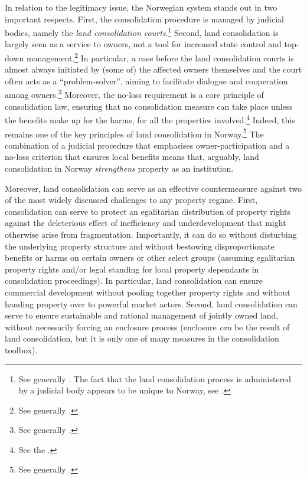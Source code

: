 In relation to the legitimacy issue, the Norwegian system stands out in two important respects. First, the consolidation procedure is managed by judicial bodies, namely the {\it land consolidation courts}.\footnote{See generally \cite{langbach09}. The fact that the land consolidation process is administered by a judicial body appears to be unique to Norway, see \cite[45]{sky01}.} Second, land consolidation is largely seen as a service to owners, not a tool for increased state control and top-down management.\footnote{See generally \cite{sky09}.} In particular, a case before the land consolidation courts is almost always initiated by (some of) the affected owners themselves and the court often acts as a ``problem-solver'', aiming to facilitate dialogue and cooperation among owners.\footnote{See generally \cite{rognes98,rognes03,rognes07}.} Moreover, the no-loss requirement is a core principle of consolidation law, ensuring that no consolidation measure can take place unless the benefits make up for the harms, for all the properties involved.\footnote{See the \cite[3 a)]{lca79}.} Indeed, this remains one of the key principles of land consolidation in Norway.\footnote{See generally \cite{rygg98}.} The combination of a judicial procedure that emphasises owner-participation and a no-loss criterion that ensures local benefits means that, arguably, land consolidation in Norway {\it strengthens} property as an institution.

Moreover, land consolidation can serve as an effective countermeasure against two of the most widely discussed challenges to any property regime. First, consolidation can serve to protect an egalitarian distribution of property rights against the deleterious effect of inefficiency and underdevelopment that might otherwise arise from fragmentation. Importantly, it can do so without disturbing the underlying property structure and without bestowing disproportionate benefits or harms on certain owners or other select groups (assuming egalitarian property rights and/or legal standing for local property dependants in consolidation proceedings). In particular, land consolidation can ensure commercial development without pooling together property rights and without handing property over to powerful market actors. Second, land consolidation can serve to ensure sustainable and rational management of jointly owned land, without necessarily forcing an enclosure process (enclosure {\it can} be the result of land consolidation, but it is only one of many measures in the consolidation toolbox). 

